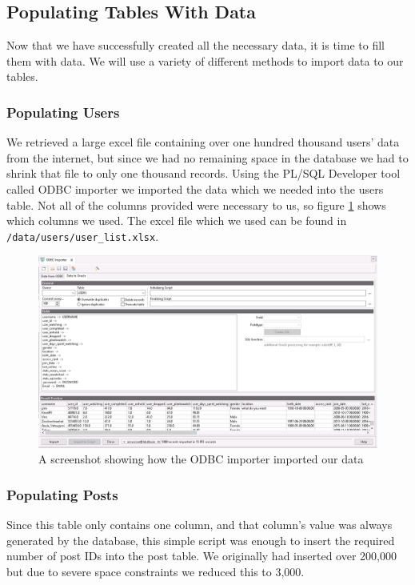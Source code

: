 \subsection{Populating Tables With Data}

Now that we have successfully created all the necessary data, it is time to fill them with data. We will use a variety of different methods to import data to our tables.

\subsubsection{Populating Users}

We retrieved a large excel file containing over one hundred thousand users' data from the internet, but since we had no remaining space in the database we had to shrink that file to only one thousand records. Using the PL/SQL Developer tool called ODBC importer we imported the data which we needed into the users table. Not all of the columns provided were necessary to us, so figure \ref{users-odbc} shows which columns we used. The excel file which we used can be found in \verb`/data/users/user_list.xlsx`.

\begin{figure}[hbtp]
	\centering
	\includegraphics[width=\linewidth]{images/users_odbc.jpeg}
	\caption{A screenshot showing how the ODBC importer imported our data}
	\label{users-odbc}
\end{figure}

\subsubsection{Populating Posts}

Since this table only contains one column, and that column's value was always generated by the database, this simple script was enough to insert the required number of post IDs into the post table. We originally had inserted over 200,000 but due to severe space constraints we reduced this to 3,000.

